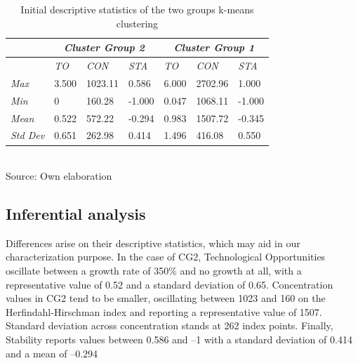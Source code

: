 \documentclass[12pt,a4paper]{article}
\begin{document}
\begin{table}[h!] 
	\caption{Initial descriptive statistics of the two groups k-means clustering}
	\centering
	\begin{tabular}{@{}lllllll@{}} 
		\toprule 
		\multicolumn{1}{c}{} & \multicolumn{3}{c}{\textit{Cluster Group 2}}                   & \multicolumn{3}{c}{\textit{Cluster   Group 1}} \\ \midrule 
		
		& \textit{TO} & \textit{CON} & \multicolumn{1}{l|}{\textit{STA}} & \textit{TO}   & \textit{CON}   & \textit{STA}  \\ \cmidrule(l){2-7}  
		
		\textit{Max}         & 3.500       & 1023.11      & \multicolumn{1}{l|}{0.586}        & 6.000         & 2702.96        & 1.000         \\ 
		
		\textit{Min}         & 0      & 160.28       & \multicolumn{1}{l|}{-1.000}       & 0.047        & 1068.11        & -1.000        \\ 
		
		\textit{Mean}        & 0.522      & 572.22       & \multicolumn{1}{l|}{-0.294}       & 0.983        & 1507.72        & -0.345        \\ 
		
		\textit{Std Dev}     & 0.651       & 262.98       & \multicolumn{1}{l|}{0.414}        & 1.496         & 416.08         & 0.550         \\ \bottomrule 
	\end{tabular} \\ 
 	Source: Own elaboration 
\end{table} 



\subsection{Inferential analysis}

Differences arise on their descriptive statistics, which may aid in our characterization purpose. In the case of CG2, Technological Opportunities oscillate between a growth rate of 350\% and no growth at all, with a representative value of 0.52 and a standard deviation of 0.65. Concentration values in CG2 tend to be smaller, oscillating between 1023 and 160 on the Herfindahl-Hirschman index and reporting a representative value of 1507. Standard deviation across concentration stands at 262 index points. Finally, Stability reports values between 0.586 and –1 with a standard deviation of 0.414 and a mean of –0.294 
\end{document}
